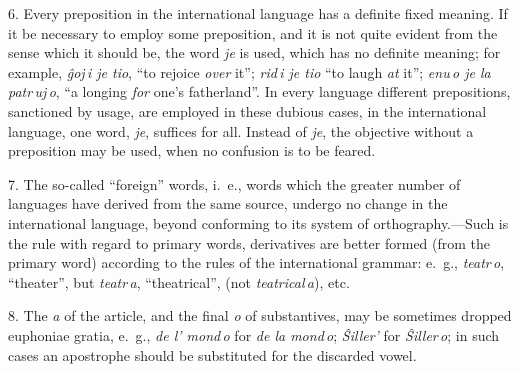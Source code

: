 6. Every preposition in the international language has a definite fixed meaning. If it be necessary to employ some preposition, and it is not quite evident from the sense which it should be, the word \emph{je} is used, which has no definite meaning; for example, \emph{ĝoj\,i je tio}, “to rejoice \emph{over} it”; \emph{rid\,i je tio} “to laugh \emph{at} it”; \emph{enu\,o je la patr\,uj\,o}, “a longing \emph{for} one’s fatherland”. In every language different prepositions, sanctioned by usage, are employed in these dubious cases, in the international language, one word, \emph{je}, suffices for all. Instead of \emph{je}, the objective without a preposition may be used, when no confusion is to be feared.

7. The so-called “foreign” words, i.~e., words which the greater number of languages have derived from the same source, undergo no change in the international language, beyond conforming to its system of orthography.---Such is the rule with regard to primary words, derivatives are better formed (from the primary word) according to the rules of the international grammar: e.~g., \emph{teatr\,o}, “theater”, but \emph{teatr\,a}, “theatrical”, (not \emph{teatrical\,a}), etc.

8. The \emph{a} of the article, and the final \emph{o} of substantives, may be sometimes dropped euphoniae gratia, e.~g., \emph{de l’ mond\,o} for \emph{de la mond\,o}; \emph{Ŝiller’} for \emph{Ŝiller\,o}; in such cases an apostrophe should be substituted for the discarded vowel. 
